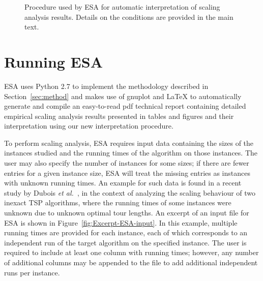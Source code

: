 \documentclass[aic]{iosart2x}
\newcommand{\etal}{\emph{et al.}}
\begin{document}
\begin{figure}[t]
\begin{centering}
{{\begin{tikzpicture}[node distance = 7em, auto]
\end{tikzpicture}}
}

\par\end{centering}{\small \par}

\caption{Procedure used by ESA for automatic interpretation of scaling analysis results. Details on the conditions are provided in the main text.}\label{fig:ESA-auto-interpretation}
\end{figure}


\section{Running ESA}
\label{sec:Implementation and Use}

ESA uses Python 2.7 to implement the methodology described in Section~\ref{sec:method} and makes use of gnuplot and \LaTeX { }to automatically generate and compile an easy-to-read pdf technical report containing detailed empirical scaling analysis results presented in tables and figures and their interpretation using our new interpretation procedure. 

\label{sec:ESA-Input}

To perform scaling analysis, ESA requires input data containing the sizes of the instances studied and the running times of the algorithm on those instances. The user may also specify the number of instances for some sizes; if there are fewer entries for a given instance size, ESA will treat the missing entries as instances with unknown running times. An example for such data is found in a recent study by Dubois \etal~\cite{DubEtAl15}, in the context of analyzing the scaling behaviour of two inexact TSP algorithms, where the running times of some instances were unknown due to unknown optimal tour lengths. 
An excerpt of an input file for ESA is shown in Figure~\ref{fig:Excerpt-ESA-input}. In this example, multiple running times are provided for each instance, each of which corresponds to an independent run of the target algorithm on the specified instance. The user is required to include at least one column with running times; however, any number of additional columns may be appended to the file to add additional independent runs per instance. 
\end{document}
